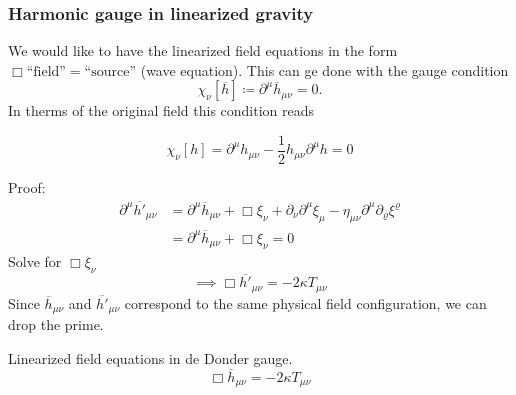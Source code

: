\subsubsection{Harmonic gauge in linearized gravity}
We would like to have the linearized field equations in the form $\Box\text{``field''}=\text{``source''}$ (wave equation).
This can ge done with the gauge condition
\begin{equation}
    \chi_\nu \left[ \overline{h} \right] \coloneqq \partial^\mu \overline{h}_{\mu\nu} = 0.
\end{equation}
In therms of the original field this condition reads
\begin{definition}
    \begin{equation}
        \chi_\nu \left[ h \right] = \partial^\mu h_{\mu\nu} - \frac{1}{2} h_{\mu\nu} \partial^\mu h = 0
    \end{equation}
\end{definition}
Proof:
\begin{equation}
    \begin{split}
        \partial^\mu \overline{h'}_{\mu\nu} &= \partial^\mu \overline{h}_{\mu\nu} + \Box \xi_\nu + \partial_\nu \partial^\mu \xi_\mu -
        \eta_{\mu\nu} \partial^\mu\partial_\varrho\xi^\varrho \\
        &= \partial^\mu \overline{h}_{\mu\nu} + \Box \xi_\nu = 0
    \end{split}
\end{equation}
Solve for $\Box\xi_\nu$
\begin{equation}
    \implies \Box \overline{h'}_{\mu\nu} = -2\kappa T_{\mu\nu}
\end{equation}
Since $\overline{h}_{\mu\nu}$ and $\overline{h'}_{\mu\nu}$ correspond to the same physical field configuration, we can drop the prime.
\begin{definition}{Linearized field equations in de Donder gauge.}
    \begin{equation}
        \Box \overline{h}_{\mu\nu} = - 2 \kappa T_{\mu\nu}
\end{equation}
\end{definition}
